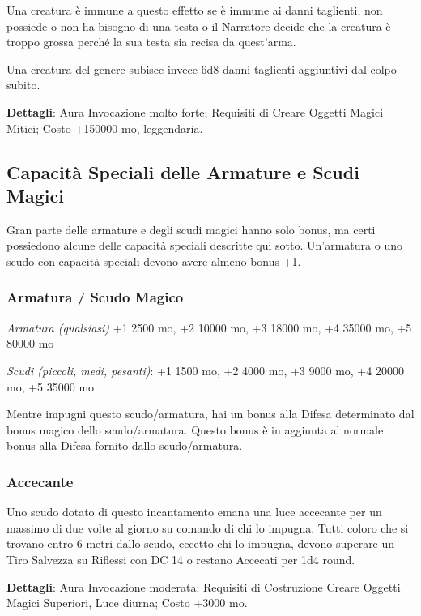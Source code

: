 \begin{multicols}{2}
Una creatura è immune a questo effetto se è immune ai danni taglienti, non possiede o non ha bisogno di una testa o il Narratore decide che la creatura è troppo grossa perché la sua testa sia recisa da quest'arma.

Una creatura del genere subisce invece 6d8 danni taglienti aggiuntivi dal colpo subito.

\textbf{Dettagli}: Aura Invocazione molto forte; Requisiti di Creare Oggetti Magici Mitici; Costo +150000 mo, leggendaria.

\subsection{Capacità Speciali delle Armature e Scudi Magici}

Gran parte delle armature e degli scudi magici hanno solo bonus, ma certi possiedono alcune delle capacità speciali descritte qui sotto. Un'armatura o uno scudo con capacità speciali devono avere almeno bonus +1.

\subsubsection*{Armatura / Scudo Magico}

\textit{Armatura (qualsiasi)} +1 2500 mo, +2 10000 mo, +3 18000 mo, +4 35000 mo, +5 80000 mo

\textit{Scudi (piccoli, medi, pesanti)}: +1 1500 mo, +2 4000 mo, +3 9000 mo, +4 20000 mo, +5 35000 mo

Mentre impugni questo scudo/armatura, hai un bonus alla Difesa determinato dal bonus magico dello scudo/armatura. Questo bonus è in aggiunta al normale bonus alla Difesa fornito dallo scudo/armatura.

\subsubsection*{Accecante}

Uno scudo dotato di questo incantamento emana una luce accecante per un massimo di due volte al giorno su comando di chi lo impugna. Tutti coloro che si trovano entro 6 metri dallo scudo, eccetto chi lo impugna, devono superare un Tiro Salvezza su Riflessi con DC 14 o restano Accecati per 1d4 round.

\textbf{Dettagli}: Aura Invocazione moderata; Requisiti di Costruzione Creare Oggetti Magici Superiori, Luce diurna; Costo +3000 mo.


\end{multicols}
